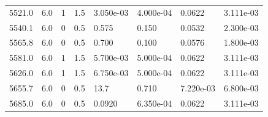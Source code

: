 \documentclass[preview]{standalone}
\begin{document}
{{{{\begin{tabular}{L{1.2cm}C{1.2cm} C{0.3cm}C{0.5cm} C{1.4cm}C{1.4cm} C{1.4cm}C{1.4cm}}
  5521.0  &   6.0  & 1     & 1.5 &  3.050e-03  & 4.000e-04  & 0.0622 &  3.111e-03   \\ 
  5540.1  &   6.0  & 0     & 0.5 &  0.575  & 0.150  & 0.0532 &  2.300e-03   \\ 
  5565.8  &   6.0  & 0     & 0.5 &  0.700  & 0.100  & 0.0576 &  1.800e-03   \\ 
  5581.0  &   6.0  & 1     & 1.5 &  5.700e-03  & 5.000e-04  & 0.0622 &  3.111e-03   \\ 
  5626.0  &   6.0  & 1     & 1.5 &  6.750e-03  & 5.000e-04  & 0.0622 &  3.111e-03   \\ 
  5655.7  &   6.0  & 0     & 0.5 &  13.7  & 0.710  & 7.220e-03 &  6.800e-03   \\ 
  5685.0  &   6.0  & 0     & 0.5 &  0.0920  & 6.350e-04  & 0.0622 &  3.111e-03   \\ 
\hline 
\end{tabular} 

}}}}
\end{document}
